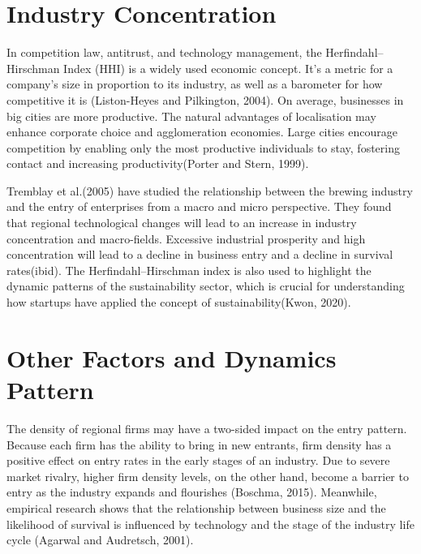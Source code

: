 \documentclass[
  12pt,
  oneside]{book}
\begin{document}
\hypertarget{industry-concentration}{%
\section{Industry Concentration}\label{industry-concentration}}

In competition law, antitrust, and technology management, the Herfindahl--Hirschman Index (HHI) is a widely used economic concept. It's a metric for a company's size in proportion to its industry, as well as a barometer for how competitive it is (Liston-Heyes and Pilkington, 2004). On average, businesses in big cities are more productive. The natural advantages of localisation may enhance corporate choice and agglomeration economies. Large cities encourage competition by enabling only the most productive individuals to stay, fostering contact and increasing productivity(Porter and Stern, 1999).

Tremblay et al.(2005) have studied the relationship between the brewing industry and the entry of enterprises from a macro and micro perspective. They found that regional technological changes will lead to an increase in industry concentration and macro-fields. Excessive industrial prosperity and high concentration will lead to a decline in business entry and a decline in survival rates(ibid). The Herfindahl--Hirschman index is also used to highlight the dynamic patterns of the sustainability sector, which is crucial for understanding how startups have applied the concept of sustainability(Kwon, 2020).

\hypertarget{other-factors-and-dynamics-pattern}{%
\section{Other Factors and Dynamics Pattern}\label{other-factors-and-dynamics-pattern}}

The density of regional firms may have a two-sided impact on the entry pattern. Because each firm has the ability to bring in new entrants, firm density has a positive effect on entry rates in the early stages of an industry. Due to severe market rivalry, higher firm density levels, on the other hand, become a barrier to entry as the industry expands and flourishes (Boschma, 2015). Meanwhile, empirical research shows that the relationship between business size and the likelihood of survival is influenced by technology and the stage of the industry life cycle (Agarwal and Audretsch, 2001).
\end{document}
